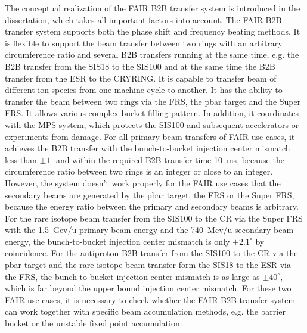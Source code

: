 The conceptual realization of the FAIR B2B transfer system is introduced in the dissertation, which takes all important factors into account. The FAIR B2B transfer system supports both the phase shift and frequency beating methods. It is flexible to support the beam transfer between two rings with an arbitrary circumference ratio and several B2B transfers running at the same time, e.g. the B2B transfer from the SIS18 to the SIS100 and at the same time the B2B transfer from the ESR to the CRYRING. It is capable to transfer beam of different ion species from one machine cycle to another. It has the ability to transfer the beam between two rings via the FRS, the pbar target and the Super FRS. It allows various complex bucket filling pattern. In addition, it coordinates with the MPS system, which protects the SIS100
and subsequent accelerators or experiments from damage. For all primary beam transfers of FAIR use cases, it achieves the B2B transfer with the bunch-to-bucket injection center mismatch less than $\pm1^\circ$ and within the required B2B transfer time \SI{10}{\ms}, because the circumference ratio between two rings is an integer or close to an integer. However, the system doesn't work properly for the FAIR use cases that the secondary beams are generated by the pbar target, the FRS or the Super FRS, because the energy ratio between the primary and secondary beams is arbitrary. For the rare isotope beam transfer from the SIS100 to the CR via the Super FRS with the \SI{1.5}{Gev/u} primary beam energy and the \SI{740}{Mev/u} secondary beam energy, the bunch-to-bucket injection center mismatch is only $\pm2.1^\circ$ by coincidence. For the antiproton B2B transfer from the SIS100 to the CR via the pbar target and the rare isotope beam transfer form the SIS18 to the ESR via the FRS, the bunch-to-bucket injection center mismatch is as large as $\pm40^\circ$, which is far beyond the upper bound injection center mismatch. For these two FAIR use cases, it is necessary to check whether the FAIR B2B transfer system can work together with specific beam accumulation methods, e.g. the barrier bucket or the unstable fixed point accumulation.
 

